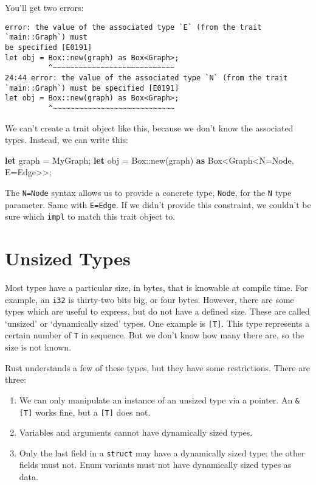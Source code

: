 \documentclass[a4paper,]{book}
\newenvironment{Shaded}{\begin{snugshade}}{\end{snugshade}}
\newcommand{\KeywordTok}[1]{\textcolor[rgb]{0.13,0.29,0.53}{\textbf{{#1}}}}
\newcommand{\DataTypeTok}[1]{\textcolor[rgb]{0.13,0.29,0.53}{{#1}}}
\newcommand{\NormalTok}[1]{{#1}}
\providecommand{\tightlist}{%
  \setlength{\itemsep}{0pt}\setlength{\parskip}{0pt}}
\begin{document}
You'll get two errors:

\begin{verbatim}
error: the value of the associated type `E` (from the trait `main::Graph`) must
be specified [E0191]
let obj = Box::new(graph) as Box<Graph>;
          ^~~~~~~~~~~~~~~~~~~~~~~~~~~~~
24:44 error: the value of the associated type `N` (from the trait
`main::Graph`) must be specified [E0191]
let obj = Box::new(graph) as Box<Graph>;
          ^~~~~~~~~~~~~~~~~~~~~~~~~~~~~
\end{verbatim}

We can't create a trait object like this, because we don't know the
associated types. Instead, we can write this:

\begin{Shaded}
\begin{Highlighting}[]
\KeywordTok{let} \NormalTok{graph = MyGraph;}
\KeywordTok{let} \NormalTok{obj = }\DataTypeTok{Box}\NormalTok{::new(graph) }\KeywordTok{as} \DataTypeTok{Box}\NormalTok{<Graph<N=Node, E=Edge>>;}
\end{Highlighting}
\end{Shaded}

The \texttt{N=Node} syntax allows us to provide a concrete type,
\texttt{Node}, for the \texttt{N} type parameter. Same with
\texttt{E=Edge}. If we didn't provide this constraint, we couldn't be
sure which \texttt{impl} to match this trait object to.

\hypertarget{sec--unsized-types}{\section{Unsized
Types}\label{sec--unsized-types}}

Most types have a particular size, in bytes, that is knowable at compile
time. For example, an \texttt{i32} is thirty-two bits big, or four
bytes. However, there are some types which are useful to express, but do
not have a defined size. These are called `unsized' or `dynamically
sized' types. One example is \texttt{{[}T{]}}. This type represents a
certain number of \texttt{T} in sequence. But we don't know how many
there are, so the size is not known.

Rust understands a few of these types, but they have some restrictions.
There are three:

\begin{enumerate}
\def\labelenumi{\arabic{enumi}.}
\tightlist
\item
  We can only manipulate an instance of an unsized type via a pointer.
  An \texttt{\&{[}T{]}} works fine, but a \texttt{{[}T{]}} does not.
\item
  Variables and arguments cannot have dynamically sized types.
\item
  Only the last field in a \texttt{struct} may have a dynamically sized
  type; the other fields must not. Enum variants must not have
  dynamically sized types as data.
\end{enumerate}
\end{document}
